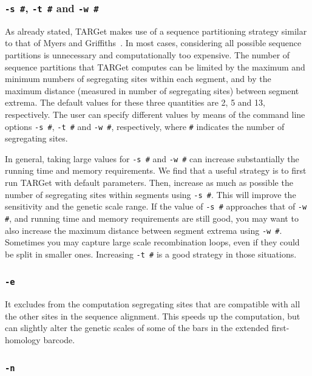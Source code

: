\documentclass[12pt]{article}
\begin{document}
\subsubsection*{\texttt{-s \#}, \texttt{-t \#} and \texttt{-w \#}}

As already stated, TARGet makes use of a sequence partitioning strategy similar to that of Myers and Griffiths~\cite{mg}. In most cases, considering all possible sequence partitions is  unnecessary and computationally too expensive. The number of sequence partitions that TARGet computes can be limited by the maximum and minimum numbers of segregating sites within each segment, and by the maximum distance (measured in number of segregating sites) between segment extrema. The default values for these three quantities are 2, 5 and 13, respectively. The user can specify different values by means of the command line options \texttt{-s \#}, \texttt{-t \#} and \texttt{-w \#}, respectively, where \texttt{\#} indicates the number of segregating sites.

In general, taking large values for \texttt{-s \#} and \texttt{-w \#} can increase substantially the running time and memory requirements. We find that a useful strategy is to first run TARGet with default parameters. Then, increase as much as possible the number of segregating sites within segments using \texttt{-s \#}. This will improve the sensitivity and the genetic scale range. If the value of \texttt{-s \#} approaches that of \texttt{-w \#}, and running time and memory requirements are still good, you may want to also increase the maximum distance between segment extrema using \texttt{-w \#}. Sometimes you may capture large scale recombination loops, even if they could be split in smaller ones. Increasing \texttt{-t \#} is a good strategy in those situations.

\subsubsection*{\texttt{-e}}

It excludes from the computation segregating sites that are compatible with all the other sites in the sequence alignment. This speeds up the computation, but can slightly alter the genetic scales of some of the bars in the extended first-homology barcode.

\subsubsection*{\texttt{-n}}
\end{document}

